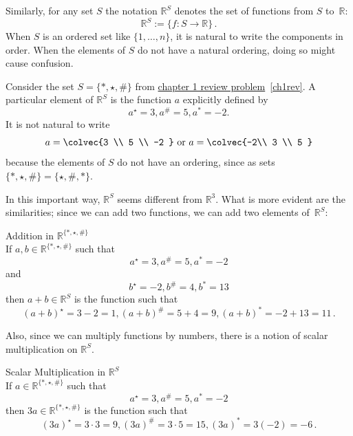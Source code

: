 Similarly, for any set $S$ the notation $\mathbb{R}^S$ denotes the set of functions from $S$ to~$\mathbb{R}$:
\[
{\mathbb R}^S:=\{ f:S\to {\mathbb R}\}\, .
\]
When $S$ is an ordered set like $\{1,\dots,n\}$, it is natural to write the components in order. When the elements of $S$ do not have a natural ordering, doing so might cause confusion. 



\begin{example}
{Consider the set } $S=\{*, \star, \# \}$ from \hyperlink{Consider the set}{chapter 1 review problem}~\ref{ch1rev}. A particular element of $\mathbb{R}^S$ is the function $a$ explicitly defined by 
\[ a^{\star}=3, a^{\#}=5, a^{*}=-2.\]
It is not natural to write 
\[
a=\colvec{3 \\ 5 \\ -2 } ~\text{or} ~a=\colvec{-2\\ 3 \\ 5 } 
\]
because the elements of $S$ do not have an ordering, since as sets $\{*, \star, \# \}=\{\star, \#,*\}$.
\end{example}


In this important way, $\mathbb{R}^S$ seems different from $\mathbb{R}^3$. 
What is more evident are the similarities; since we can add two functions, we can add two elements of~$\mathbb{R}^S$:

\begin{example} Addition in $\mathbb{R}^{\{*, \star, \# \}}$\\
If $a,b \in \mathbb{R}^{\{*, \star, \# \}}$ 
such that 
\[a^{\star}=3, a^{\#}=5, a^{*}=-2\] 
and 
\[b^{\star}=-2, b^{\#}=4, b^{*}=13\]
then $a+b \in \mathbb{R}^S$ is the function such that
\[(a+b)^{\star}=3-2=1, (a+b)^{\#}=5+4=9, (a+b)^{*}=-2+13=11\, .\]
\end{example}

Also, since we can multiply functions by  numbers, there is a notion of scalar multiplication on $\mathbb{R}^S$.

\begin{example} Scalar Multiplication in $\mathbb{R}^S$\\
If $a \in \mathbb{R}^{\{*, \star, \# \}}$ such that
\[a^{\star}=3, a^{\#}=5, a^{*}=-2\]
then $3 a \in \mathbb{R}^{\{*, \star, \# \}}$ is the function such that 
\[(3a)^{\star}=3\cdot3=9, (3a)^{\#}=3\cdot5=15, (3a)^{*}=3(-2)=-6\, .\]

\end{example}

